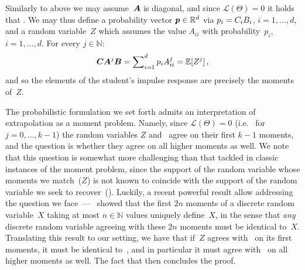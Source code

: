 \begin{sproof}
Similarly to above we may assume~${\bm{A}}$ is diagonal, and since $\mathcal{L} ( \Theta ) = 0$ it holds that .
We may thus define a probability vector ${\bm{p}} \in \mathbb{R}^{d}$ via $p_i={C}_i{B}_i$, $i = 1 , \ldots , d$, and a random variable~$Z$ which assumes the value $A_{i i}$ with probability~$p_i$, $i = 1 , \ldots , d$.
For every $j \in \mathbb{N}$:
\[
{\bm{C}} {\bm{A}}^j {\bm{B}} = \sum\nolimits_{i=1}^d {p}_i {A}_{i i} ^j = \mathbb{E}[ Z^j]
\text{\,,}
\]
and so the elements of the student's impulse response are precisely the moments of~$Z$.

The probabilistic formulation we set forth admits an interpretation of extrapolation as a moment problem.
Namely, since $\mathcal{L} ( \Theta ) = 0$ (i.e.~ for $j=0,\dots,k-1$) the random variables $Z$ and~ agree on their first $k - 1$ moments, and the question is whether they agree on all higher moments as well.
We note that this question is somewhat more challenging than that tackled in classic instances of the moment problem, since the support of the random variable whose moments we match~($Z$) is not known to coincide with the support of the random variable we seek to recover~().
Luckily, a recent powerful result allow addressing the question we face~---~\cite{cohen2011use} showed that the first $2 n$ moments of a discrete random variable~$X$ taking at most $n \in \mathbb{N}$ values uniquely define~$X$, in the sense that \emph{any} discrete random variable agreeing with these $2 n$ moments must be identical to~$X$.
Translating this result to our setting, we have that if~$Z$ agrees with~ on its first~ moments, it must be identical to~, and in particular it must agree with~ on all higher moments as well. 
The fact that  then concludes the proof.



\end{sproof}
